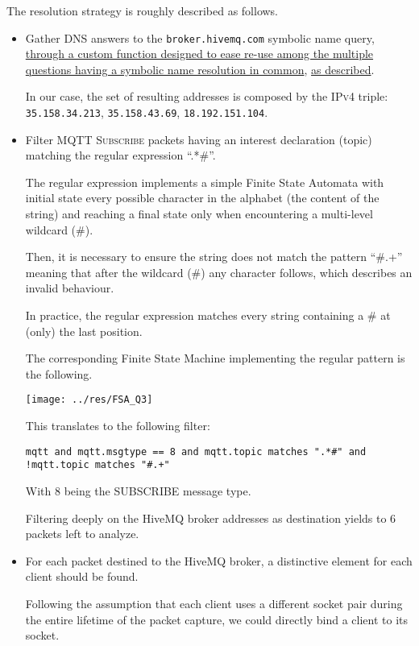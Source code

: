 \documentclass[a4paper,11pt]{article} %
\begin{document}
    The resolution strategy is roughly described as follows.
    \begin{itemize}
        \item Gather \textsc{DNS} answers to the \texttt{broker.hivemq.com} symbolic name query, \hyperref[subsubsec:dns-resolution-python]{through a custom function designed to ease re-use among the multiple questions having a symbolic name resolution in common}, \hyperref[sec:question-n.-2]{as described}.

        In our case, the set of resulting addresses is composed by the \textsc{IPv4} triple: \texttt{35.158.34.213}, \texttt{35.158.43.69}, \texttt{18.192.151.104}.
        \item Filter \textsc{MQTT Subscribe} packets having an interest declaration (topic) matching the regular expression “.*\#”.

        The regular expression implements a simple Finite State Automata with initial state every possible character in the alphabet (the content of the string) and reaching a final state only when encountering a multi-level wildcard (\#).

        Then, it is necessary to ensure the string does not match the pattern “\#.+” meaning that after the wildcard (\#) any character follows, which describes an invalid behaviour.

        In practice, the regular expression matches every string containing a \# at (only) the last position.

        The corresponding Finite State Machine implementing the regular pattern is the following.

        \begin{center}
            \texttt{[image: ../res/FSA\_Q3]}
        \end{center}

        This translates to the following filter:

        \texttt{mqtt and mqtt.msgtype == 8 and mqtt.topic matches ".*\#" and !mqtt.topic matches "\#.+"}

        With 8 being the \textsc{SUBSCRIBE} message type.

        Filtering deeply on the HiveMQ broker addresses as destination yields to 6 packets left to analyze.
        \item For each packet destined to the HiveMQ broker, a distinctive element for each client should be found.

        Following the assumption that each client uses a different socket pair during the entire lifetime of the packet capture, we could directly bind a client to its socket.


\end{itemize}
\end{document}

